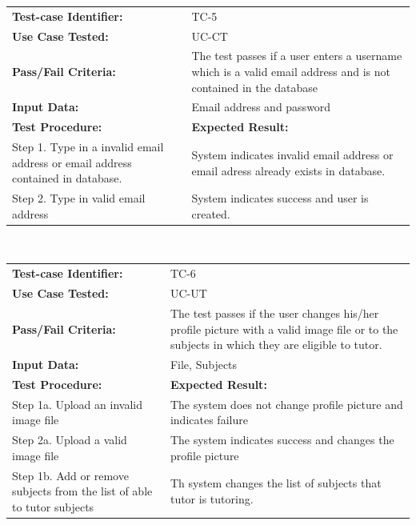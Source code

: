 \documentclass[12pt]{article}
\begin{document}
{%
\begin{tabular}{| p{8cm} | p{8cm} |} \hline
	\textbf{Test-case Identifier:}& TC-5\\
	\textbf{Use Case Tested:}& UC-CT\\
	\textbf{Pass/Fail Criteria:}& The test passes if a user enters a username which is a valid email address
	and is not contained in the database\\
	\textbf{Input Data:}& Email address and password\\\hline
	\textbf{Test Procedure:}& \textbf{Expected Result:} \\\hline
	Step 1. Type in a invalid email address or email address contained in database.
	& System indicates invalid email address or email adress already exists in database.\\
	Step 2. Type in valid email address  & System indicates success and user is created.\\\hline
\end{tabular}
\\


\begin{tabular}{| p{8cm} | p{8cm} |} \hline
	\textbf{Test-case Identifier:}& TC-6\\
	\textbf{Use Case Tested:}& UC-UT\\
	\textbf{Pass/Fail Criteria:}& The test passes if the user changes his/her profile picture with a valid image file or to the subjects in which they are eligible to tutor.\\
	\textbf{Input Data:}& File, Subjects\\\hline
	\textbf{Test Procedure:}& \textbf{Expected Result:} \\\hline
	Step 1a. Upload an invalid image file & The system does not change profile picture and indicates failure\\
	Step 2a. Upload a valid image file & The system indicates success and changes the profile picture\\
		Step 1b. Add or remove subjects from the list of able to tutor subjects & Th system changes the list of subjects that tutor is tutoring.  \\\hline
\end{tabular}
\\

}
\end{document}
